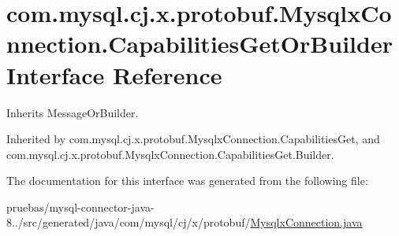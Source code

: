 \hypertarget{interfacecom_1_1mysql_1_1cj_1_1x_1_1protobuf_1_1_mysqlx_connection_1_1_capabilities_get_or_builder}{}\section{com.\+mysql.\+cj.\+x.\+protobuf.\+Mysqlx\+Connection.\+Capabilities\+Get\+Or\+Builder Interface Reference}
\label{interfacecom_1_1mysql_1_1cj_1_1x_1_1protobuf_1_1_mysqlx_connection_1_1_capabilities_get_or_builder}


Inherits Message\+Or\+Builder.



Inherited by com.\+mysql.\+cj.\+x.\+protobuf.\+Mysqlx\+Connection.\+Capabilities\+Get, and com.\+mysql.\+cj.\+x.\+protobuf.\+Mysqlx\+Connection.\+Capabilities\+Get.\+Builder.



The documentation for this interface was generated from the following file\+:\begin{DoxyCompactItemize}
\item 
pruebas/mysql-\/connector-\/java-\/8../src/generated/java/com/mysql/cj/x/protobuf/\mbox{\hyperlink{_mysqlx_connection_8java}{Mysqlx\+Connection.\+java}}\end{DoxyCompactItemize}
